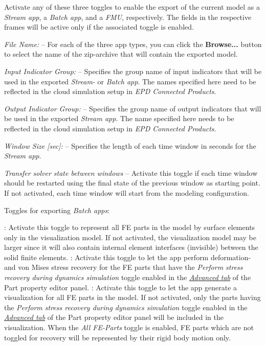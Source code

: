 \begin{bulletlist}
\item
  Activate any of these three toggles to enable the export of the current model
  as a {\sl Stream app}, a {\sl Batch app}, and a {\sl FMU}, respectively.
  The fields in the respective frames will be active only if the associated
  toggle is enabled.

\item{\sl File Name:} --
  For each of the three app types, you can click the \textbf{Browse...} button
  to select the name of the zip-archive that will contain the exported model.

\item{\sl Input Indicator Group:} --
  Specifies the group name of input indicators that will be used in the exported
  {\sl Stream-} or {\sl Batch app}. The names specified here need to be
  reflected in the cloud simulation setup in {\sl EPD Connected Products}.

\item{\sl Output Indicator Group:} --
  Specifies the group name of output indicators that will be used in the
  exported {\sl Stream app}. The name specified here needs to be
  reflected in the cloud simulation setup in {\sl EPD Connected Products}.

\item{\sl Window Size [sec]:} --
  Specifies the length of each time window in seconds for the {\sl Stream app}.

\item{\sl Transfer solver state between windows} --
  Activate this toggle if each time window should be restarted using the final
  state of the previous window as starting point. If not activated,
  each time window will start from the modeling configuration.

\item Toggles for exporting {\sl Batch apps}:
  \begin{itemize}
   :
    Activate this toggle to represent all FE parts in the model by surface
    elements only in the visualization model. If not activated,
    the visualization model may be larger since it will also contain internal
    element interfaces (invisible) between the solid finite elements.
   :
    Activate this toggle to let the app perform deformation- and von Mises
    stress recovery for the FE parts that have the
    {\sl Perform stress recovery during dynamics simulation} toggle enabled in
    the \protect\hyperlink{advanced-tab}{\sl Advanced tab} of
    the Part property editor panel.
   :
    Activate this toggle to let the app generate a visualization for all
    FE parts in the model. If not activated, only the parts having the
    {\sl Perform stress recovery during dynamics simulation} toggle enabled
    in the \protect\hyperlink{advanced-tab}{\sl Advanced tab} of the Part
    property editor panel will be included in the visualization. When the
    {\sl All FE-Parts} toggle is enabled, FE parts which are not toggled for
    recovery will be represented by their rigid body motion only.
  \end{itemize}


\end{bulletlist}
